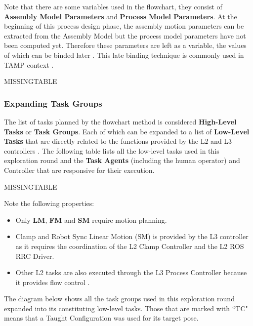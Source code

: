 


Note that there are some variables used in the flowchart, they consist of \textbf{Assembly Model Parameters} and \textbf{Process Model Parameters}. At the beginning of this process design phase, the assembly motion parameters can be extracted from the Assembly Model but the process model parameters have not been computed yet. Therefore these parameters are left as a variable, the values of which can be binded later . This late binding technique is commonly used in TAMP context \parencite{garrettIntegratedTaskMotion2021a, lozanoperezConstraintBasedMethodSolving2014}.

MISSINGTABLE

\subsubsection{Expanding Task Groups}
\label{subsubsection:exploration-3-expanding-task-groups}

The list of tasks planned by the flowchart method is considered \textbf{High-Level Tasks }or \textbf{Task Groups}. Each of which can be expanded to a list of \textbf{Low-Level Tasks} that are directly related to the functions provided by the L2 and L3 controllers . The following table lists all the low-level tasks used in this exploration round and the \textbf{Task Agents }(including the human operator) and Controller that are responsive for their execution.

MISSINGTABLE

Note the following properties:

\begin{itemize}
	\item Only \textbf{LM}, \textbf{FM }and \textbf{SM }require motion planning. 

	\item Clamp and Robot Sync Linear Motion (SM) is provided by the L3 controller as it requires the coordination of the L2 Clamp Controller and the L2 ROS RRC Driver. 

	\item Other L2 tasks are also executed through the L3 Process Controller because it provides flow control . 

\end{itemize}
The diagram below shows all the task groups used in this exploration round expanded into its constituting low-level tasks. Those that are marked with ``TC" means that a Taught Configuration was used for its target pose.

